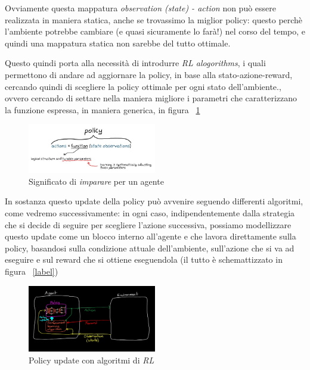 Ovviamente questa mappatura \textit{observation (state) - action} non può essere realizzata in maniera statica, anche se trovassimo la miglior policy: questo perchè l'ambiente potrebbe cambiare (e quasi sicuramente lo farà!) nel corso del tempo, e quindi una mappatura statica non sarebbe del tutto ottimale.

Questo quindi porta alla necessità di introdurre \textit{RL alogorithms}, i quali permettono di andare ad aggiornare la policy, in base alla stato-azione-reward, cercando quindi di scegliere la policy ottimale per ogni stato dell'ambiente., ovvero cercando di settare nella maniera migliore i parametri che caratterizzano la funzione espressa, in maniera generica, in figura ~\ref{fig:PolicyFunction}

\begin{figure}[!h]
	\centering
	\includegraphics[width=0.5\textwidth]{Immagini/PolicyLearning.JPG}
	\caption{Significato di \textit{imparare} per un agente}
	\label{fig:PolicyFunction}
\end{figure}

\newpage

In sostanza questo update della policy può avvenire seguendo differenti algoritmi, come vedremo successivamente: in ogni caso, indipendentemente dalla strategia che si decide di seguire per scegliere l'azione successiva, possiamo modellizzare questo update come un blocco interno all'agente e che lavora direttamente sulla policy, basandosi sulla condizione attuale dell'ambiente, sull'azione che si va ad eseguire e sul reward che si ottiene eseguendola (il tutto è schemattizzato in figura ~\ref{label})

\begin{figure}[!h]
	\centering
	\includegraphics[width=0.5\textwidth]{Immagini/Policy_update.png}
	\caption{Policy update con algoritmi di \textit{RL}}
	\label{fig:Policy_update}
\end{figure}


